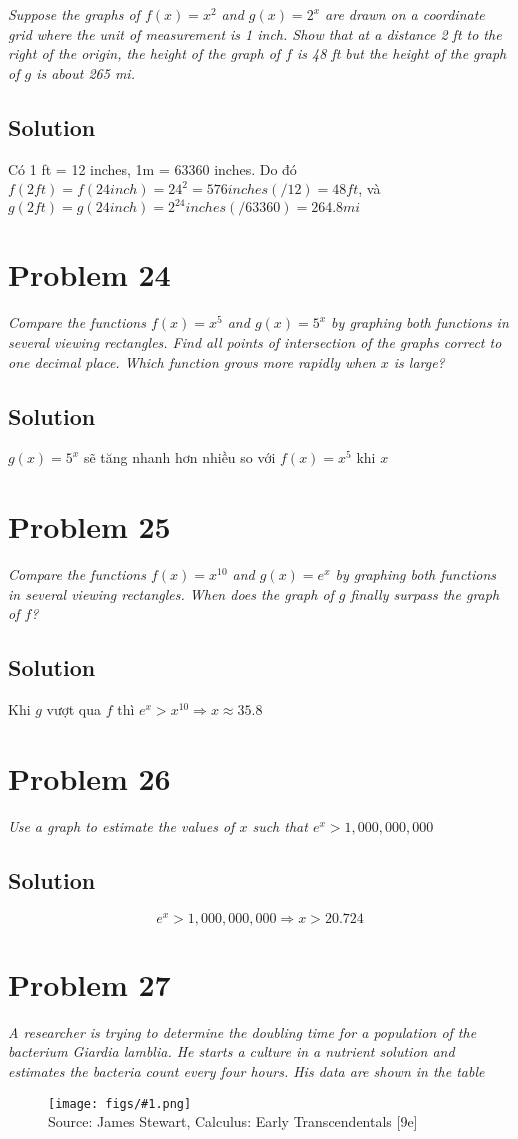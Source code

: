 \documentclass[11pt]{article}
\newcommand{\soln}{\subsection*}
\newcommand{\qn}{\textit}
\newcommand{\imagesource}[1]{{\footnotesize Source: #1}}
\newcommand{\imgqn}[1]{
	\begin{figure}[H]
		\centering
		\texttt{[image: figs/\#1.png]}\\
		\imagesource{James Stewart, Calculus: Early Transcendentals [9e]}
	\end{figure}
}
\begin{document}
\qn{Suppose the graphs of $f(x)=x^2$ and $g(x)=2^x$ are drawn on a coordinate grid where the unit of measurement is 1 inch. Show that at a distance 2 ft to the right of the origin, the height of the graph of $f$ is 48 ft but the height of the graph of $g$ is about 265 mi.}

\soln{Solution}
Có 1 ft = 12 inches, 1m = 63360 inches. Do đó $f(2 ft)=f(24 inch)=24^2=576 inches (/12)=48 ft$, và $g(2 ft)=g(24 inch)=2^{24} inches (/63360) = 264.8 mi$

\section*{Problem 24}

\qn{Compare the functions $f(x)=x^5$ and $g(x)=5^x$ by graphing both functions in several viewing rectangles. Find all points of intersection of the graphs correct to one decimal place. Which function grows more rapidly when $x$ is large?}

\soln{Solution}
$g(x)=5^x$ sẽ tăng nhanh hơn nhiều so với $f(x)=x^5$ khi $x$ 

\section*{Problem 25}

\qn{Compare the functions $f(x)=x^{10}$ and $g(x)=e^x$ by graphing both functions in several viewing rectangles. When does the graph of $g$ finally surpass the graph of $f$?}

\soln{Solution}
Khi $g$ vượt qua $f$ thì $e^x>x^10 \Rightarrow x \approx 35.8$

\section*{Problem 26}

\qn{Use a graph to estimate the values of $x$ such that $e^x > 1,000,000,000$}

\soln{Solution}
$$e^x > 1,000,000,000 \Rightarrow x > 20.724$$

\section*{Problem 27}

\qn{A researcher is trying to determine the doubling time for a population of the bacterium \textit{Giardia lamblia}. He starts a culture in a nutrient solution and estimates the bacteria count every four hours. His data are shown in the table}
\imgqn{1.4.27}
\end{document}
